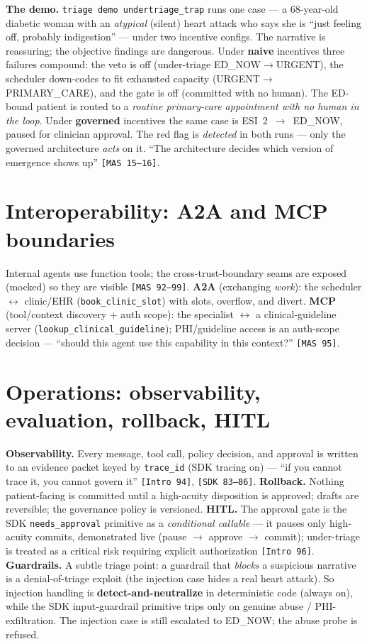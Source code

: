 \documentclass[11pt]{article}
\newcommand{\code}[1]{\texttt{#1}}
\begin{document}
\textbf{The demo.} \code{triage demo undertriage\_trap} runs one case --- a 68-year-old diabetic
woman with an \emph{atypical} (silent) heart attack who says she is ``just feeling off, probably
indigestion'' --- under two incentive configs. The narrative is reassuring; the objective
findings are dangerous. Under \textbf{naive} incentives three failures compound: the veto is off
(under-triage ED\_NOW$\rightarrow$URGENT), the scheduler down-codes to fit exhausted capacity
(URGENT$\rightarrow$PRIMARY\_CARE), and the gate is off (committed with no human). The
ED-bound patient is routed to a \emph{routine primary-care appointment with no human in the
loop}. Under \textbf{governed} incentives the same case is ESI~2~$\rightarrow$~ED\_NOW, paused
for clinician approval. The red flag is \emph{detected} in both runs --- only the governed
architecture \emph{acts} on it. ``The architecture decides which version of emergence shows up''
\code{[MAS 15--16]}.

\section{Interoperability: A2A and MCP boundaries}
Internal agents use function tools; the cross-trust-boundary seams are exposed (mocked) so they
are visible \code{[MAS 92--99]}. \textbf{A2A} (exchanging \emph{work}): the scheduler $\leftrightarrow$
clinic/EHR (\code{book\_clinic\_slot}) with slots, overflow, and divert. \textbf{MCP} (tool/context
discovery + auth scope): the specialist $\leftrightarrow$ a clinical-guideline server
(\code{lookup\_clinical\_guideline}); PHI/guideline access is an auth-scope decision --- ``should
this agent use this capability in this context?'' \code{[MAS 95]}.

\section{Operations: observability, evaluation, rollback, HITL}
\textbf{Observability.} Every message, tool call, policy decision, and approval is written to an
evidence packet keyed by \code{trace\_id} (SDK tracing on) --- ``if you cannot trace it, you
cannot govern it'' \code{[Intro 94]}, \code{[SDK 83--86]}. \textbf{Rollback.} Nothing
patient-facing is committed until a high-acuity disposition is approved; drafts are reversible;
the governance policy is versioned. \textbf{HITL.} The approval gate is the SDK \code{needs\_approval}
primitive as a \emph{conditional callable} --- it pauses only high-acuity commits, demonstrated
live (pause $\rightarrow$ approve $\rightarrow$ commit); under-triage is treated as a critical
risk requiring explicit authorization \code{[Intro 96]}. \textbf{Guardrails.} A subtle triage
point: a guardrail that \emph{blocks} a suspicious narrative is a denial-of-triage exploit (the
injection case hides a real heart attack). So injection handling is \textbf{detect-and-neutralize}
in deterministic code (always on), while the SDK input-guardrail primitive trips only on genuine
abuse / PHI-exfiltration. The injection case is still escalated to ED\_NOW; the abuse probe is
refused.
\end{document}
